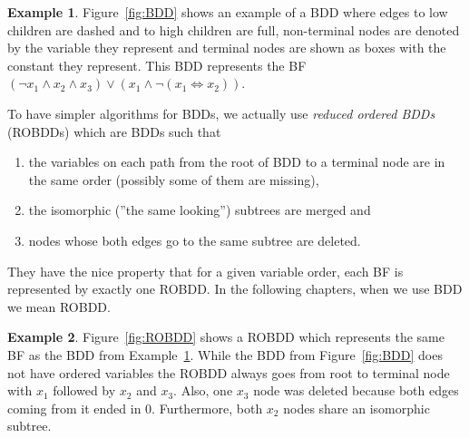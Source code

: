 \documentclass[
  digital, %
  twoside, %
  table,   %
  nolof,     %
  nolot,     %
]{fithesis3}
\theoremstyle{definition}
\newtheorem{example}{Example}
\theoremstyle{remark}
\newcommand{\lequal}{\Leftrightarrow}
\begin{document}
\begin{example}
\label{ex:BDD}
Figure~\ref{fig:BDD} shows an example of a BDD where edges to low children are dashed and to high children are full, non-terminal nodes are denoted by the variable they represent and terminal nodes are shown as boxes with the constant they represent. %
This BDD represents the BF $(\neg x_1 \land x_2 \land x_3) \lor (x_1 \land \neg (x_1 \lequal x_2))$. 
\end{example}

To have simpler algorithms for BDDs, we actually use \emph{reduced ordered BDDs} (ROBDDs) which are BDDs such that 
\begin{enumerate}
    \item the variables on each path from the root of BDD to a terminal node are in the same order (possibly some of them are missing),
    \item the isomorphic (''the same looking'') subtrees are merged and
    \item nodes whose both edges go to the same subtree are deleted.
\end{enumerate}
They have the nice property that for a given variable order, each BF is represented by exactly one ROBDD. In the following chapters, when we use BDD we mean ROBDD.

\begin{example}
\label{ex:ROBDD}
Figure~\ref{fig:ROBDD} shows a ROBDD which represents the same BF as the BDD from Example~\ref{ex:BDD}. While the BDD from Figure~\ref{fig:BDD} does not have ordered variables the ROBDD always goes from root to terminal node with $x_1$ followed by $x_2$ and $x_3$. Also, one $x_3$ node was deleted because both edges coming from it ended in $0$. Furthermore, both $x_2$ nodes share an isomorphic subtree.
\end{example}


\end{document}
